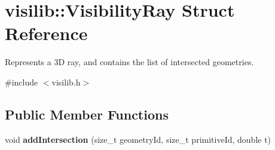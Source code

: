 \hypertarget{structvisilib_1_1_visibility_ray}{}\section{visilib\+::Visibility\+Ray Struct Reference}
\label{structvisilib_1_1_visibility_ray}


Represents a 3D ray, and contains the list of intersected geometries.  




{\ttfamily \#include $<$visilib.\+h$>$}

\subsection*{Public Member Functions}
\begin{DoxyCompactItemize}
\item 
\mbox{\label{structvisilib_1_1_visibility_ray_abdcc6b677206ac4226530a32f3ce58ec}} 
void {\bfseries add\+Intersection} (size\+\_\+t geometry\+Id, size\+\_\+t primitive\+Id, double t)
\end{DoxyCompactItemize}
